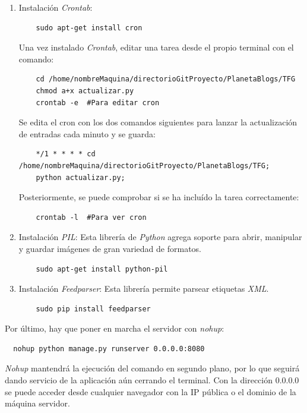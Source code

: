 \documentclass[a4paper, 12pt]{book}
\begin{document}
\begin{enumerate}
  Una vez clonado el repositorio donde se ubica el proyecto, hay que modificar unas rutas en el fichero \texttt{settings.py}: 
  La ruta de las plantillas ''TEMPLATE\_DIRS'', la ruta del path del fichero de configuraci\'on ''SETTINGS\_PATH'', la ruta con los ficheros est\'aticos 
  ''STATICFILES\_DIRS'' y la ruta de los ficheros multimedia ''MEDIA\_ROOT''. Cambiar la ra\'iz por la ruta:
    {\footnotesize\begin{verbatim} 
    /home/nombreMaquina/directorioGitProyecto/PlanetaBlogs/TFG/(.....) \end{verbatim}}
  \item Instalaci\'on \textit{Crontab}:
    {\footnotesize\begin{verbatim} 
    sudo apt-get install cron \end{verbatim}}
  Una vez instalado \textit{Crontab}, editar una tarea desde el propio terminal con el comando:
    {\footnotesize\begin{verbatim} 
    cd /home/nombreMaquina/directorioGitProyecto/PlanetaBlogs/TFG
    chmod a+x actualizar.py
    crontab -e 	#Para editar cron\end{verbatim}}
  Se edita el cron con los dos comandos siguientes para lanzar la actualizaci\'on de entradas cada minuto y se guarda:
    {\footnotesize\begin{verbatim} 
    */1 * * * * cd /home/nombreMaquina/directorioGitProyecto/PlanetaBlogs/TFG; 
    python actualizar.py; \end{verbatim}}
  Posteriormente, se puede comprobar si se ha inclu\'ido la tarea correctamente:
    {\footnotesize\begin{verbatim} 
    crontab -l 	#Para ver cron \end{verbatim}}
  \item Instalaci\'on \textit{PIL}: Esta librer\'ia de \textit{Python} agrega soporte para abrir, manipular y guardar im\'agenes de gran variedad de 
  formatos.
    {\footnotesize\begin{verbatim} 
    sudo apt-get install python-pil \end{verbatim}}
  \item Instalaci\'on \textit{Feedparser}: Esta librer\'ia permite parsear etiquetas \textit{XML}.
    {\footnotesize\begin{verbatim} 
    sudo pip install feedparser \end{verbatim}}
\end{enumerate}
Por \'ultimo, hay que poner en marcha el servidor con \textit{nohup}:
  {\footnotesize\begin{verbatim} 
  nohup python manage.py runserver 0.0.0.0:8080\end{verbatim}}
\textit{Nohup} mantendr\'a la ejecuci\'on del comando en segundo plano, por lo que seguir\'a dando servicio de la aplicaci\'on a\'un cerrando el terminal. 
Con la direcci\'on 0.0.0.0 se puede acceder desde cualquier navegador con la IP p\'ublica o el dominio de la m\'aquina servidor.
\end{document}
